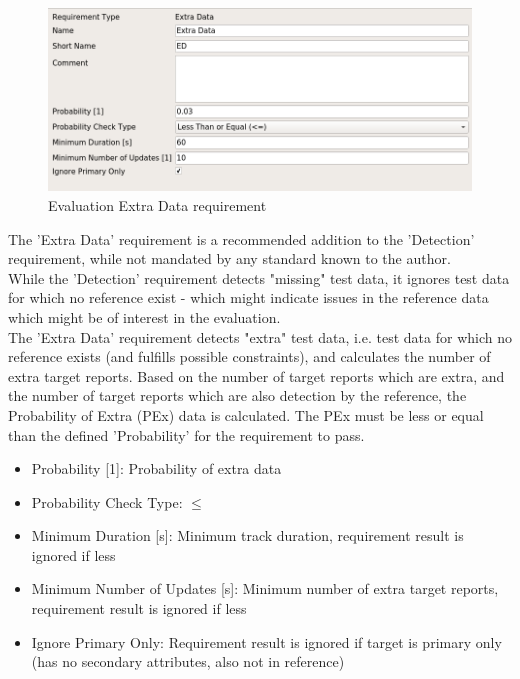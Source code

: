 \begin{figure}[H]
    \includegraphics[width=14cm,frame]{figures/eval_req_extra_data.png}
  \caption{Evaluation Extra Data requirement}
\end{figure}

The 'Extra Data' requirement is a recommended addition to the 'Detection' requirement, while not mandated by any standard known to the author. \\

While the 'Detection' requirement detects "missing" test data, it ignores test data for which no reference exist - which might indicate issues in the reference data which might be of interest in the evaluation. \\

The 'Extra Data' requirement detects "extra" test data, i.e. test data for which no reference exists (and fulfills possible constraints), and calculates the number of extra target reports. Based on the number of target reports which are extra, and the number of target reports which are also detection by the reference, the Probability of Extra (PEx) data is calculated. The PEx must be less or equal than the defined 'Probability' for the requirement to pass. \\

\begin{itemize}  
\item Probability [1]: Probability of extra data
\item Probability Check Type: $\leq$
\item Minimum Duration [s]: Minimum track duration, requirement result is ignored if less
\item Minimum Number of Updates [s]: Minimum number of extra target reports, requirement result is ignored if less
\item Ignore Primary Only: Requirement result is ignored if target is primary only (has no secondary attributes, also not in reference)
\end{itemize}

